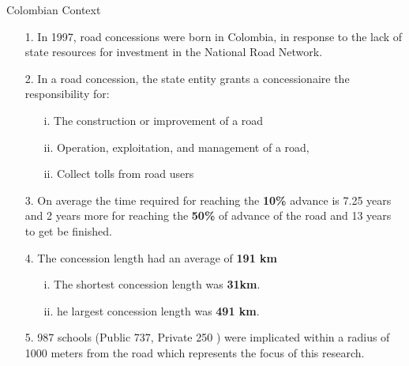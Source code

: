 \documentclass[9pt]{beamer}
\begin{document}




\begin{frame}{Colombian Context} \label{general_context}
\justifying
    \begin{itemize}
        \item[1.] In 1997, road concessions were born in Colombia, in response to the lack of state resources for investment in the National Road Network. \justifying
        \item[2.] In a road concession, the state entity grants a concessionaire the responsibility for:
            \begin{itemize}
                \item[i. ] The construction or improvement of a road
                \item[ii. ] Operation, exploitation, and management of a road,
                \item[ii. ] Collect tolls from road users
            \end{itemize}
    \item[3.] On average the time required for reaching the \textbf{10\%} advance is 7.25 years and 2 years more for reaching the \textbf{50\%} of advance of the road and 13 years to get be finished.
    \item[4.] The concession length had an average of \textbf{191 km}
        \begin{itemize}
            \item[i. ] The shortest concession length was \textbf{31km}.
            \item[ii. ] he largest concession length was \textbf{491 km}.
        \end{itemize}
    \item[5.] 987  schools (Public 737, Private 250 ) were implicated within a radius of 1000 meters from the road which represents the focus of this research. 
    
 
    \end{itemize}
 \hyperlink{roads1}{}
\end{frame}
\end{document}
